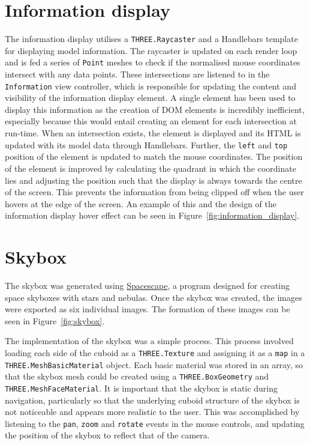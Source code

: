 \section{Information display} {
\label{sec:information_display}

	The information display utilises a \texttt{THREE.Raycaster} and a Handlebars template for displaying model information. The raycaster is updated on each render loop and is fed a series of \texttt{Point} meshes to check if the normalised mouse coordinates intersect with any data points. These intersections are listened to in the \texttt{Information} view controller, which is responsible for updating the content and visibility of the information display element. A single element has been used to display this information as the creation of DOM elements is incredibly inefficient, especially because this would entail creating an element for each intersection at run-time. When an intersection exists, the element is displayed and its HTML is updated with its model data through Handlebars. Further, the \texttt{left} and \texttt{top} position of the element is updated to match the mouse coordinates. The position of the element is improved by calculating the quadrant in which the coordinate lies and adjusting the position such that the display is always towards the centre of the screen. This prevents the information from being clipped off when the user hovers at the edge of the screen. An example of this and the design of the information display hover effect can be seen in Figure~\ref{fig:information_display}.

	

}

\section{Skybox} {
\label{sec:skybox}

	The skybox was generated using \href{http://alexcpeterson.com/spacescape/}{Spacescape}, a program designed for creating space skyboxes with stars and nebulas. Once the skybox was created, the images were exported as six individual images. The formation of these images can be seen in Figure~\ref{fig:skybox}.

	

	\begin{sloppypar}
		The implementation of the skybox was a simple process. This process involved loading each side of the cuboid as a \texttt{THREE.Texture} and assigning it as a \texttt{map} in a \texttt{THREE.MeshBasicMaterial} object. Each basic material was stored in an array, so that the skybox mesh could be created using a \texttt{THREE.BoxGeometry} and \texttt{THREE.MeshFaceMaterial}. It is important that the skybox is static during navigation, particularly so that the underlying cuboid structure of the skybox is not noticeable and appears more realistic to the user. This was accomplished by listening to the \texttt{pan}, \texttt{zoom} and \texttt{rotate} events in the mouse controls, and updating the position of the skybox to reflect that of the camera.
	\end{sloppypar}

}

